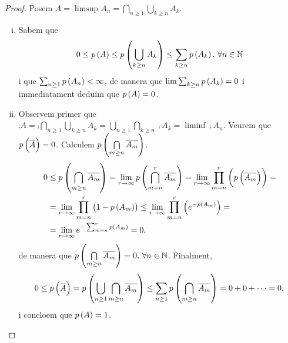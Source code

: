 \begin{proof}
    Posem $A=\limsup A_n=\bigcap\limits_{n\geq 1}\bigcup\limits_{k\geq n} A_k$.
    \begin{enumerate}[i)]
        \item Sabem que
            \[
                0\leq p\left( A\right)\leq p\left(\bigcup_{k\geq n}A_k\right)\leq\sum_{k\geq n} p\left( A_k\right) ,\,\forall n\in\mathbb{N}
            \]
            i que $\sum_{n\geq 1} p\left( A_n\right)<\infty$, de manera que $\lim \sum_{k\geq n} p\left( A_k\right)=0$ i immediatament deduïm que $p\left( A\right)=0$.
        \item Observem primer que $\comp{A}=\comp{\bigcap\limits_{n\geq 1}\bigcup\limits_{k\geq n} A_k}=\bigcup\limits_{n\geq 1}\bigcap\limits_{k\geq n} \comp{A_k}=\liminf\comp{A_n}$. Veurem que $p\left( \overline{A}\right)=0$. Calculem $p\left( \bigcap\limits_{m\geq n} \overline{A_m}\right)$.
        \begin{align*}
            0&\leq p\left( \bigcap\limits_{m\geq n} \overline{A_m}\right) = \lim_{r\to\infty} p\left( \bigcap\limits_{m= n}^r \overline{A_m}\right) = \lim_{r\to\infty} \prod_{m= n}^r \left( p\left(\overline{A_m}\right)\right) =\\
            &= \lim_{r\to\infty} \prod_{m= n}^r \left( 1-p\left( A_m\right)\right) \leq \lim_{r\to\infty} \prod_{m= n}^r \left( e^{-p\left( A_m\right)}\right) =\\
            &=\lim_{r\to\infty} e^{-\sum_{m= n}^r p\left( A_m\right)} = 0,
        \end{align*}
        de manera que $p\left( \bigcap\limits_{m\geq n} \overline{A_m}\right)=0, \,\forall n\in\mathbb{N}$.
        Finalment,
        \[
            0\leq p\left(\overline{A}\right)=p\left(\bigcup\limits_{n\geq 1}\bigcap\limits_{m\geq n} \overline{A_m}\right)\leq\sum_{n\geq 1}p\left(\bigcap\limits_{m\geq n} \overline{A_m}\right)=0+0+\cdots=0,
        \]
        i concloem que $p\left( A\right)=1$.
    \end{enumerate}
\end{proof}
